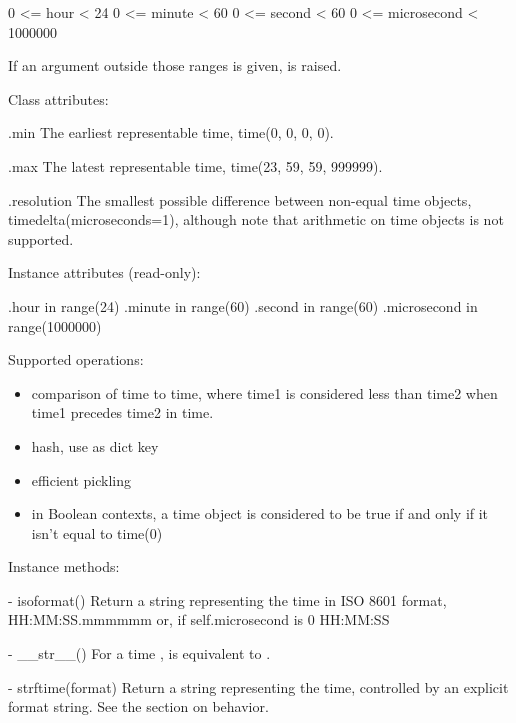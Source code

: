         0 <= hour < 24
        0 <= minute < 60
        0 <= second < 60
        0 <= microsecond < 1000000

    If an argument outside those ranges is given,
     is raised.

Class attributes:

    .min
        The earliest representable time, time(0, 0, 0, 0).

    .max
        The latest representable time, time(23, 59, 59, 999999).

    .resolution
        The smallest possible difference between non-equal time
        objects, timedelta(microseconds=1), although note that
        arithmetic on time objects is not supported.

Instance attributes (read-only):

    .hour           in range(24)
    .minute         in range(60)
    .second         in range(60)
    .microsecond    in range(1000000)

Supported operations:

\begin{itemize}
  \item
    comparison of time to time, where time1 is considered
    less than time2 when time1 precedes time2 in time.

  \item
    hash, use as dict key

  \item
    efficient pickling

  \item
    in Boolean contexts, a time object is considered to be true
    if and only if it isn't equal to time(0)
\end{itemize}

Instance methods:

  - isoformat()
    Return a string representing the time in ISO 8601 format,
        HH:MM:SS.mmmmmm
    or, if self.microsecond is 0
        HH:MM:SS

  - __str__()
    For a time ,  is equivalent to
    .

  - strftime(format)
    Return a string representing the time, controlled by an explicit
    format string.  See the section on  behavior.


\subsection{ \label{datetime-tzinfo}}

